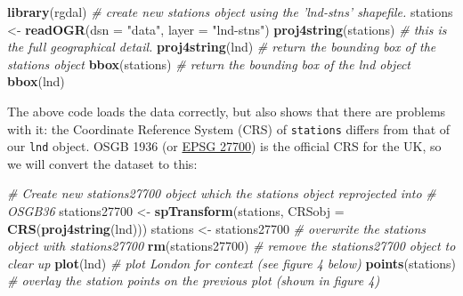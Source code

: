 \documentclass[]{article}
\newenvironment{Shaded}{}{}
\newcommand{\KeywordTok}[1]{\textcolor[rgb]{0.00,0.44,0.13}{\textbf{{#1}}}}
\newcommand{\DataTypeTok}[1]{\textcolor[rgb]{0.56,0.13,0.00}{{#1}}}
\newcommand{\StringTok}[1]{\textcolor[rgb]{0.25,0.44,0.63}{{#1}}}
\newcommand{\CommentTok}[1]{\textcolor[rgb]{0.38,0.63,0.69}{\textit{{#1}}}}
\newcommand{\NormalTok}[1]{{#1}}
\begin{document}
\begin{Shaded}
\begin{Highlighting}[]
\KeywordTok{library}\NormalTok{(rgdal)}
\CommentTok{# create new stations object using the 'lnd-stns' shapefile.}
\NormalTok{stations <-}\StringTok{ }\KeywordTok{readOGR}\NormalTok{(}\DataTypeTok{dsn =} \StringTok{"data"}\NormalTok{, }\DataTypeTok{layer =} \StringTok{"lnd-stns"}\NormalTok{)}
\KeywordTok{proj4string}\NormalTok{(stations)  }\CommentTok{# this is the full geographical detail.}
\KeywordTok{proj4string}\NormalTok{(lnd)}
\CommentTok{# return the bounding box of the stations object}
\KeywordTok{bbox}\NormalTok{(stations)}
\CommentTok{# return the bounding box of the lnd object}
\KeywordTok{bbox}\NormalTok{(lnd)}
\end{Highlighting}
\end{Shaded}

The above code loads the data correctly, but also shows that there are
problems with it: the Coordinate Reference System (CRS) of
\texttt{stations} differs from that of our \texttt{lnd} object. OSGB
1936 (or \href{http://spatialreference.org/ref/epsg/27700/}{EPSG 27700})
is the official CRS for the UK, so we will convert the dataset to this:

\begin{Shaded}
\begin{Highlighting}[]
\CommentTok{# Create new stations27700 object which the stations object reprojected into}
\CommentTok{# OSGB36}
\NormalTok{stations27700 <-}\StringTok{ }\KeywordTok{spTransform}\NormalTok{(stations, }\DataTypeTok{CRSobj =} \KeywordTok{CRS}\NormalTok{(}\KeywordTok{proj4string}\NormalTok{(lnd)))}
\NormalTok{stations <-}\StringTok{ }\NormalTok{stations27700  }\CommentTok{# overwrite the stations object with stations27700}
\KeywordTok{rm}\NormalTok{(stations27700)  }\CommentTok{# remove the stations27700 object to clear up}
\KeywordTok{plot}\NormalTok{(lnd)  }\CommentTok{# plot London for context (see figure 4 below) }
\KeywordTok{points}\NormalTok{(stations)  }\CommentTok{# overlay the station points on the previous plot (shown in figure 4)}
\end{Highlighting}
\end{Shaded}
\end{document}

